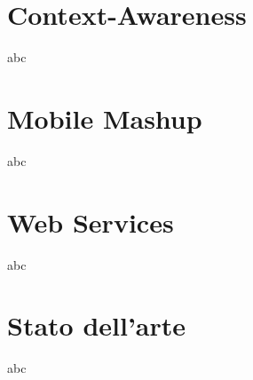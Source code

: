\section{Context-Awareness}

abc

\section{Mobile Mashup}

abc

\section{Web Services}

abc

\section{Stato dell'arte}

abc